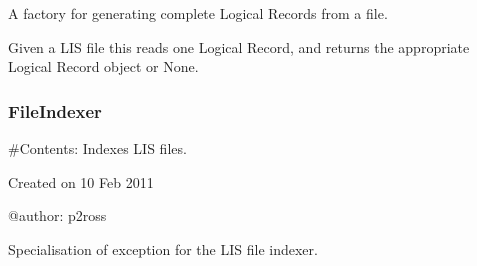 \documentclass[letterpaper,10pt,english]{sphinxmanual}
\begin{document}
\begin{fulllineitems}
\label{\detokenize{ref/LIS/core/LogiRec:TotalDepth.LIS.core.LogiRec.LrFactoryRead}}
A factory for generating complete Logical Records from a file.

\begin{fulllineitems}
\label{\detokenize{ref/LIS/core/LogiRec:TotalDepth.LIS.core.LogiRec.LrFactoryRead.retLrFromFile}}
Given a LIS file this reads one Logical Record, and returns the
appropriate Logical Record object or None.

\end{fulllineitems}


\end{fulllineitems}



\subsubsection{FileIndexer}
\label{\detokenize{ref/LIS/core/FileIndexer:totaldepth-lis-core-fileindexer}}\label{\detokenize{ref/LIS/core/FileIndexer::doc}}\label{\detokenize{ref/LIS/core/FileIndexer:fileindexer}}
\#Contents:
\label{\detokenize{ref/LIS/core/FileIndexer:module-TotalDepth.LIS.core.FileIndexer}}
Indexes LIS files.

Created on 10 Feb 2011

@author: p2ross

\begin{fulllineitems}
\label{\detokenize{ref/LIS/core/FileIndexer:TotalDepth.LIS.core.FileIndexer.ExceptionFileIndex}}
Specialisation of exception for the LIS file indexer.

\end{fulllineitems}

\end{document}
